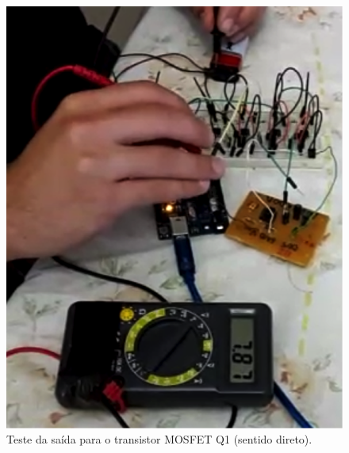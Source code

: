 \begin{anexosenv}
      \begin{figure}
          \begin{center}
              \includegraphics{figuras/teste_alimentacao_2.png}
          \end{center}
          \caption{Teste da saída para o transistor MOSFET Q1 (sentido direto).}
          \label{fig:teste_alimentacao_2.png}
      \end{figure}


\end{anexosenv}
